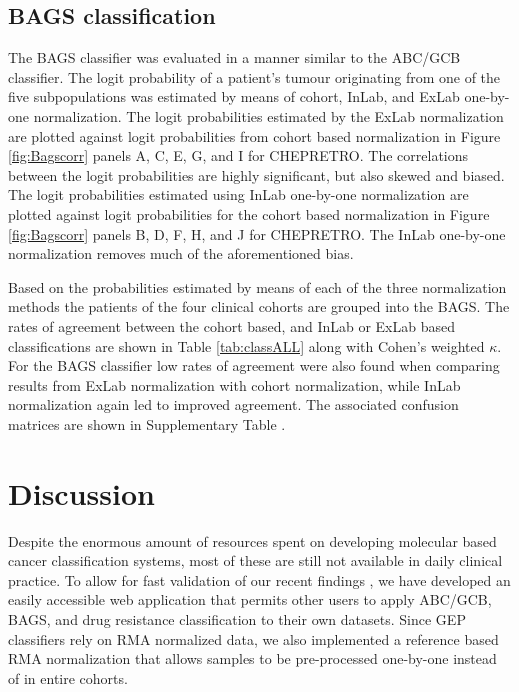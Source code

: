 \documentclass[10pt,letterpaper]{article}
\begin{document}
\subsection*{BAGS classification}
The BAGS classifier was evaluated in a manner similar to the ABC/GCB classifier.
The logit probability of a patient's tumour originating from one of the five subpopulations was estimated by means of cohort, InLab, and ExLab one-by-one normalization.
The logit probabilities estimated by the ExLab normalization are plotted against logit probabilities from cohort based normalization in Figure \ref{fig:Bagscorr} panels A, C, E, G, and I for CHEPRETRO.
The correlations between the logit probabilities are highly significant, but also skewed and biased.
The logit probabilities estimated using InLab one-by-one normalization are plotted against logit probabilities for the cohort based normalization in Figure \ref{fig:Bagscorr} panels B, D, F, H, and J for CHEPRETRO.
The InLab one-by-one normalization removes much of the aforementioned bias.

Based on the probabilities estimated by means of each of the three normalization methods the patients of the four clinical cohorts are grouped into the BAGS.
The rates of agreement between the cohort based, and InLab or ExLab based classifications are shown in Table \ref{tab:classALL} along with Cohen's weighted $\kappa$. For the BAGS classifier low rates of agreement were also found when comparing results from ExLab normalization with cohort normalization, while InLab normalization again led to improved agreement. 
The associated confusion matrices are shown in Supplementary Table .




\section*{Discussion}
Despite the enormous amount of resources spent on developing molecular based cancer classification systems,
most of these are still not available in daily clinical practice.
To allow for fast validation of our recent findings \cite{DybkaerBoegsted2015, Falgreen2015}, we have developed an easily accessible web application that permits other users to apply ABC/GCB, BAGS, and drug resistance classification to their own datasets. Since GEP classifiers rely on RMA normalized data, we also implemented a reference based RMA normalization that allows samples to be pre-processed one-by-one instead of in entire cohorts.
\end{document}
